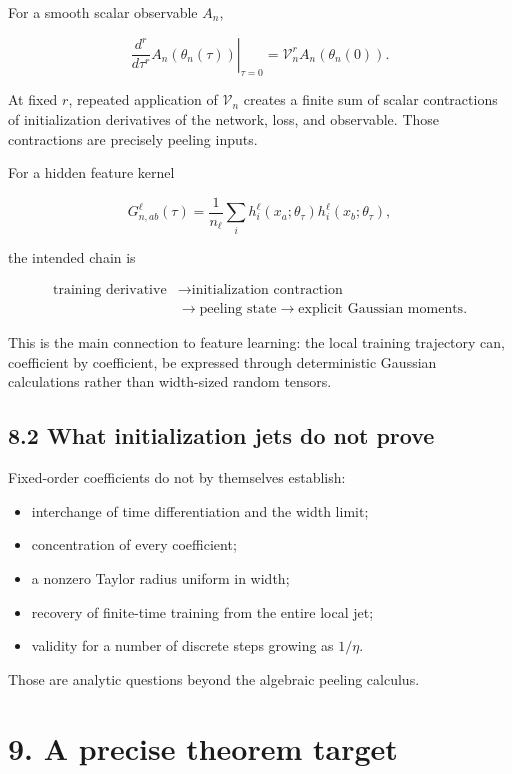 For a smooth scalar observable \(A_n\),

\[
\left.
\frac{d^r}{d\tau^r}
A_n(\theta_n(\tau))
\right|_{\tau=0}
=
\mathcal V_n^rA_n(\theta_n(0)).
\]


At fixed \(r\), repeated application of \(\mathcal V_n\) creates a finite sum
of scalar contractions of initialization derivatives of the network, loss,
and observable. Those contractions are precisely peeling inputs.

For a hidden feature kernel

\[
G^\ell_{n,ab}(\tau)
=
\frac1{n_\ell}\sum_i
h_i^\ell(x_a;\theta_\tau)
h_i^\ell(x_b;\theta_\tau),
\]


the intended chain is

\[
\begin{aligned}
\text{training derivative}
&\longrightarrow
\text{initialization contraction}
\\
&\longrightarrow
\text{peeling state}
\longrightarrow
\text{explicit Gaussian moments}.
\end{aligned}
\]


This is the main connection to feature learning: the local training trajectory
can, coefficient by coefficient, be expressed through deterministic Gaussian
calculations rather than width-sized random tensors.

\subsection*{8.2 What initialization jets do not prove}


Fixed-order coefficients do not by themselves establish:

\begin{itemize}
\item interchange of time differentiation and the width limit;
\item concentration of every coefficient;
\item a nonzero Taylor radius uniform in width;
\item recovery of finite-time training from the entire local jet;
\item validity for a number of discrete steps growing as \(1/\eta\).
\end{itemize}


Those are analytic questions beyond the algebraic peeling calculus.

\section*{9. A precise theorem target}


